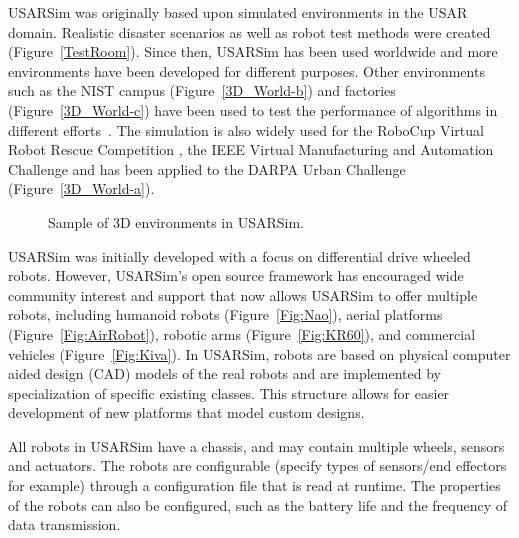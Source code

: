 USARSim was originally based upon simulated environments in the USAR domain. Realistic disaster scenarios as well as robot test methods were created (Figure~\ref{TestRoom}).
Since then, USARSim has been used worldwide and more environments have been developed for different purposes. Other environments such as the NIST campus (Figure~\ref{3D_World-b}) and factories (Figure~\ref{3D_World-c}) have been used to test the performance of algorithms in different efforts~\cite{WANG.HFES.2005,BALAGUER.IROS.2008,KOOTBALLY.ITEA.2010}. The simulation is also widely used for the RoboCup Virtual Robot Rescue Competition \cite{RoboCupWeb}, the IEEE Virtual Manufacturing and Automation Challenge \cite{VMACWeb} and has been applied to the DARPA Urban Challenge (Figure~\ref{3D_World-a}).

\begin{figure}[t!]
\centering
{}\qquad
{}\qquad
{}\qquad%
\caption{Sample of 3D environments in USARSim.} \label{3D_World}
\end{figure}

USARSim was initially developed with a focus on differential drive wheeled robots. However, USARSim's open source framework has encouraged wide community interest and support that now allows USARSim to offer multiple robots, including humanoid robots (Figure~\ref{Fig:Nao}), aerial platforms (Figure~\ref{Fig:AirRobot}), robotic arms (Figure~\ref{Fig:KR60}), and commercial vehicles (Figure~\ref{Fig:Kiva}). In USARSim, robots are based on physical computer aided design (CAD) models of the real
robots and are implemented by specialization of specific existing classes. This structure allows for easier development of new platforms that model custom designs.

All robots in USARSim have a chassis, and may contain multiple wheels, sensors and
actuators. The robots are configurable (specify types of
sensors/end effectors for example) through a configuration file that is read at runtime. The properties of the robots can
also be configured, such as the battery life and the frequency of
data transmission.

